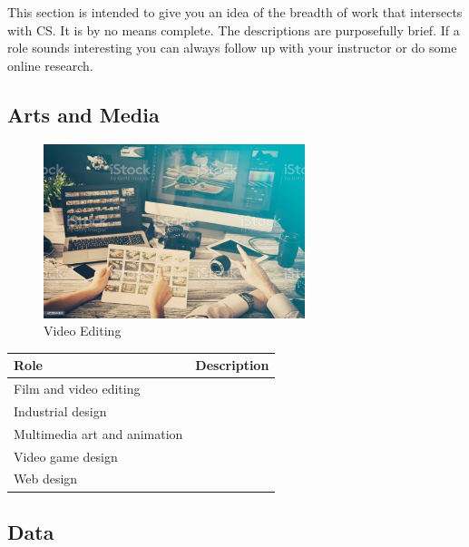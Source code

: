 This section is intended to give you an idea of the breadth of work that intersects with CS. It is by no means complete. The descriptions are purposefully brief. If a role sounds interesting you can always follow up with your instructor or do some online research.

\subsection{Arts and Media}

\begin{figure}[H]
	\begin{center}
		\caption{Video Editing}
		\vskip 4pt
		\includegraphics[height=2in]{images/careers/istockphoto-922654000-1024x1024.jpg}
	\end{center}
\end{figure}

\begin{table}[H]
	\begin{center}
		\begin{tabular}{p{1.5in}|p{2.9in}} 
			\textbf{Role} & \textbf{Description}\\
			\hline
			Film and video editing & \\
			\hline
			Industrial design & \\
			\hline
			Multimedia art and animation & \\
			\hline
			Video game design & \\
			\hline
			Web design & \\
		\end{tabular}
	\end{center}
\end{table}


\subsection{Data}


